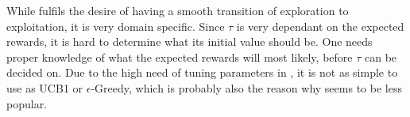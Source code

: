 While \soft fulfils the desire of having a smooth transition of exploration to exploitation, it is very domain specific. Since $\tau$ is very dependant on the expected rewards, it is hard to determine what its initial value should be. One needs proper knowledge of what the expected rewards will most likely, before $\tau$ can be decided on. Due to the high need of tuning parameters in \soft, it is not as simple to use as UCB1 or $\epsilon$-Greedy, which is probably also the reason why seems to be less popular.